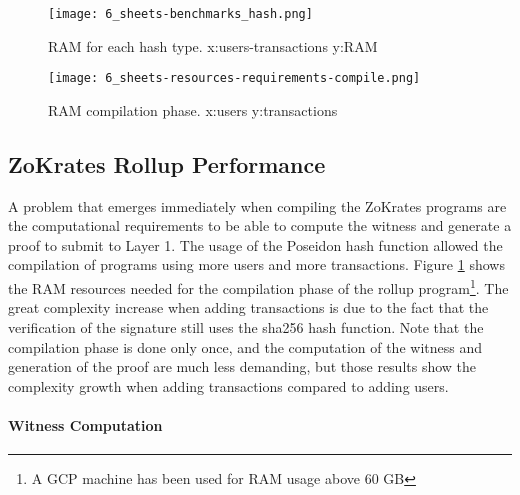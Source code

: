 \begin{figure}
	\centering
	\begin{minipage}{.48\textwidth}
		\centering
		\texttt{[image: 6\_sheets-benchmarks\_hash.png]}
		\caption[RAM Usage hash]{RAM for each hash type. \newline x:users-transactions y:RAM}
		\label{fig:7_sheets-benchmarks_hash.png}
	\end{minipage}
	\begin{minipage}{.48\textwidth}
		\centering
		\texttt{[image: 6\_sheets-resources-requirements-compile.png]}
		\caption[RAM Compile]{RAM compilation phase. \newline x:users y:transactions}
		\label{fig:7_sheets-resources-requirements-compile.png}
	\end{minipage}%
\end{figure}

\subsection{ZoKrates Rollup Performance\label{subsec:6_zokratesperf}}

A problem that emerges immediately when compiling the ZoKrates programs are the computational requirements to be able to compute the witness and generate a proof to submit to Layer 1. The usage of the Poseidon hash function allowed the compilation of programs using more users and more transactions. Figure \ref{fig:7_sheets-resources-requirements-compile.png} shows the RAM resources needed for the compilation phase of the rollup program\footnote{A GCP machine has been used for RAM usage above 60 GB}. The great complexity increase when adding transactions is due to the fact that the verification of the signature still uses the sha256 hash function. Note that the compilation phase is done only once, and the computation of the witness and generation of the proof are much less demanding, but those results show the complexity growth when adding transactions compared to adding users.

\paragraph{Witness Computation}

